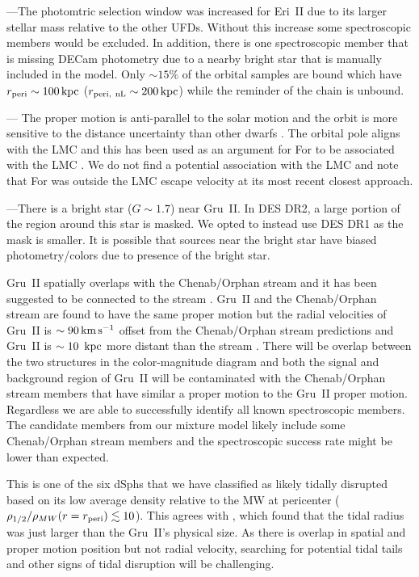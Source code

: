 \documentclass[twocolumn]{aastex63}
\begin{document}
---The photomtric selection window was increased for Eri~II due to its larger stellar mass relative to the other UFDs. Without this increase some spectroscopic members would be  excluded.  In addition, there is one spectroscopic member that is missing DECam photometry due to a nearby bright star that is manually included in the model. 
Only $\sim15\%$ of the orbital samples are bound which  have  $r_{\rm peri}\sim 100\mathrm{\,kpc}$ ($r_{\rm peri,~nL}\sim 200\mathrm{\,kpc}$) while the reminder of the chain is unbound. 

---
The proper motion is anti-parallel to the solar motion and the orbit is more sensitive to the distance uncertainty than other dwarfs \citep{Borukhovetskaya2022MNRAS.509.5330B}. 
The orbital pole aligns with the LMC and this has been used as an argument for For to be associated with the LMC \citep{Pardy2020MNRAS.492.1543P}.  We do not find a potential association with the LMC and note that For was outside the LMC escape velocity at its most recent closest approach. 


---There is a bright star ($G\sim1.7$) near Gru~II. In DES DR2, a large portion of the region around this star is masked.  We opted to instead use DES DR1 \citep{DES2018ApJS..239...18A_DR1} as the mask is smaller. It is possible that sources near the bright star have biased photometry/colors due to presence of the bright star.


Gru~II  spatially overlaps with the Chenab/Orphan stream and it has been suggested to be connected to the stream \citep{Koposov2019MNRAS.485.4726K}.  
Gru~II and the Chenab/Orphan stream  are found to have the same proper motion \citep{Shipp2019ApJ...885....3S} but the radial velocities of Gru~II is $\sim90 \mathrm{\,km} \mathrm{\,s}^{-1}$ offset from the Chenab/Orphan stream predictions \citep{Simon2020ApJ...892..137S} and Gru~II is $\sim10~\mathrm{\,kpc}$ more distant than the stream \citep{MartinezVazquez2019MNRAS.490.2183M}. 
There will  be overlap between the two structures  in the color-magnitude diagram and both the signal and background region of Gru~II will be contaminated with the Chenab/Orphan stream members that have similar a proper motion to the  Gru~II proper motion.  Regardless we are able to successfully identify all known spectroscopic members.
The candidate members from our mixture model likely include some Chenab/Orphan stream members and the spectroscopic success rate might be lower than expected. 

This is one of the six dSphs that we have classified as likely tidally disrupted based on its low average density relative to the MW at pericenter ($\rho_{1/2}/\rho_{MW}(r=r_{\rm peri}) \lesssim 10$). This agrees with \citet{Simon2020ApJ...892..137S}, which found that the tidal radius was just larger than the Gru~II's physical size. As there is overlap in spatial and proper motion position but not radial velocity, searching for potential tidal tails and other signs of tidal disruption will be challenging. 
\end{document}
